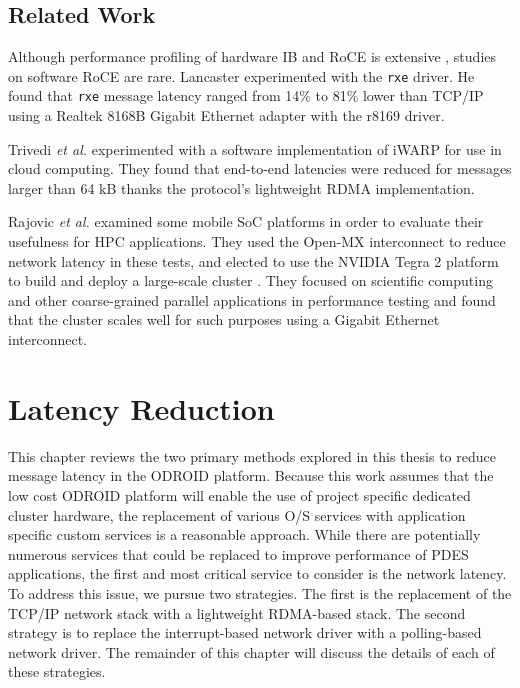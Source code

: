 \documentclass[11pt]{book}
\begin{document}
\section{Related Work}

Although performance profiling of hardware IB and RoCE is extensive
\cite{subamaroni-09,vienne-12}, studies on software RoCE are rare.  Lancaster
\cite{lancaster-10} experimented with the \verb;rxe; driver.  He found that \verb;rxe;
message latency ranged from 14\% to 81\% lower than TCP/IP using a Realtek 8168B Gigabit
Ethernet adapter with the r8169 driver.

Trivedi \emph{et al.} \cite{trivedi-11} experimented with a software implementation of
iWARP for use in cloud computing.  They found that end-to-end latencies were reduced for
messages larger than 64 kB thanks the protocol's lightweight RDMA implementation.

Rajovic \emph{et al.} \cite{rajovic-13} examined some mobile SoC platforms in order to
evaluate their usefulness for HPC applications.  They used the Open-MX interconnect to
reduce network latency in these tests, and elected to use the NVIDIA Tegra 2 platform to
build and deploy a large-scale cluster \cite{rajovic-14}.  They focused on scientific
computing and other coarse-grained parallel applications in performance testing and found
that the cluster scales well for such purposes using a Gigabit Ethernet interconnect.

\chapter{Latency Reduction}\label{latency_reduction}

This chapter reviews the two primary methods explored in this thesis to reduce message
latency in the ODROID platform.  Because this work assumes that the low cost ODROID
platform will enable the use of project specific dedicated cluster hardware, the
replacement of various O/S services with application specific custom services is a
reasonable approach.  While there are potentially numerous services that could be replaced
to improve performance of PDES applications, the first and most critical service to
consider is the network latency.  To address this issue, we pursue two strategies.  The
first is the replacement of the TCP/IP network stack with a lightweight RDMA-based stack.
The second strategy is to replace the interrupt-based network driver with a polling-based
network driver.  The remainder of this chapter will discuss the details of each of these
strategies. 
\end{document}
